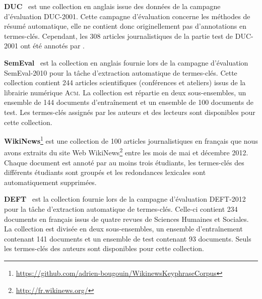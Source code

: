     \textbf{DUC}~\citep{over2001duc} est une collection en anglais issue des
    données de la campagne d'évaluation DUC-2001. Cette campagne d'évaluation
    concerne les méthodes de résumé automatique, elle ne contient donc
    originellement pas d'annotations en termes-clés. Cependant, les 308 articles
    journalistiques de la partie test de DUC-2001 ont été annotés par
    \cite{wan2008expandrank}.

    \textbf{SemEval}~\citep{kim2010semeval} est la collection en anglais fournie
    lors de la campagne d'évaluation SemEval-2010 pour la tâche d'extraction
    automatique de termes-clés. Cette collection contient 244 articles
    scientifiques (conférences et ateliers) issus de la librairie numérique
    \textsc{Acm}. La collection est répartie en deux sous-ensembles, un ensemble
    de 144 documents d'entraînement et un ensemble de 100 documents de test. Les
    termes-clés assignés par les auteurs et des lecteurs sont disponibles pour
    cette collection.

    \textbf{WikiNews}\footnote{\url{https://github.com/adrien-bougouin/WikinewsKeyphraseCorpus}}
    est une collection de 100 articles journalistiques en français que nous
    avons extraits du site Web WikiNews\footnote{\url{http://fr.wikinews.org/}}
    entre les mois de mai et décembre 2012. Chaque document est annoté par au
    moins trois étudiants, les termes-clés des différents étudiants sont groupés
    et les redondances lexicales sont automatiquement supprimées.

    \textbf{DEFT}~\citep{paroubek2012deft} est la collection fournie lors de la
    campagne d'évaluation DEFT-2012 pour la tâche d'extraction automatique de
    termes-clés. Celle-ci contient 234 documents en français issus de quatre
    revues de Sciences Humaines et Sociales. La collection est divisée en deux
    sous-ensembles, un ensemble d'entraînement contenant 141 documents et un
    ensemble de test contenant 93 documents.  Seuls les termes-clés des auteurs
    sont disponibles pour cette collection.

